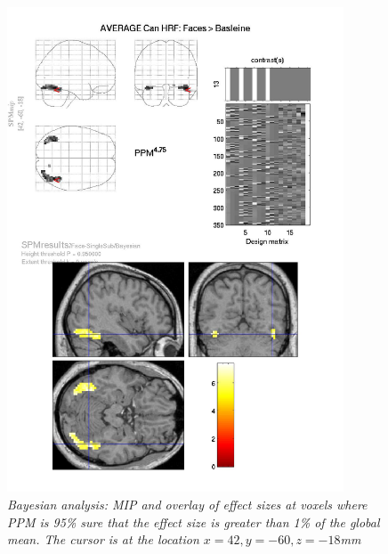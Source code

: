 \begin{figure}
\begin{center}
\includegraphics[width=100mm]{faces/face_bayes}
\caption{\em Bayesian analysis: MIP and overlay of effect sizes at voxels where PPM is 95\% sure that the effect size is greater than 1\% of the global mean. The cursor is at the location $x=42,y=-60,z=-18$mm\label{face_bayes} }
\end{center}
\end{figure}
